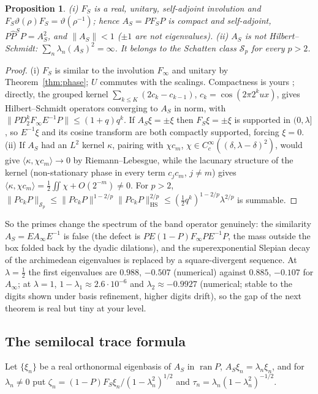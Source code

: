 \documentclass[11pt]{amsart}
\newtheorem{proposition}[theorem]{Proposition}
\theoremstyle{definition}
\theoremstyle{remark}
\newcommand{\ran}{\operatorname{ran}}
\newcommand{\Pih}{\widehat P}
\begin{document}
\begin{proposition}\label{prop:AS}
\emph{(i)} $F_S$ is a real, unitary, self-adjoint involution and $F_S\vartheta(\rho)F_S=\vartheta(\rho^{-1})$; hence
$A_S=PF_SP$ is compact and self-adjoint, $P\Pih^SP=A_S^2$, and $\|A_S\|<1$ ($\pm1$ are not eigenvalues).
\emph{(ii)} $A_S$ is not Hilbert--Schmidt: $\sum_n\lambda_n(A_S)^2=\infty$. It belongs to the Schatten class
$\mathcal S_p$ for every $p>2$.
\end{proposition}
\begin{proof}
(i) $F_S$ is similar to the involution $F_\infty$ and unitary by Theorem~\ref{thm:phase}; $U$ commutes with the scalings.
Compactness is yours \cite[Thms.~2.1, 4.4]{CCquasi}; directly, the grouped kernel $\sum_{k\le K}(2c_k-c_{k-1})$,
$c_k=\cos(2\pi2^kux)$, gives Hilbert--Schmidt operators converging to $A_S$ in norm, with
$\|PD_2^kF_\infty E^{-1}P\|\le(1+q)q^k$. If $A_S\xi=\pm\xi$ then $F_S\xi=\pm\xi$ is supported in $(0,\lambda]$, so
$E^{-1}\xi$ and its cosine transform are both compactly supported, forcing $\xi=0$.
(ii) If $A_S$ had an $L^2$ kernel $\kappa$, pairing with $\chi c_m$, $\chi\in C_c^\infty((\delta,\lambda-\delta)^2)$, would
give $\langle\kappa,\chi c_m\rangle\to0$ by Riemann--Lebesgue, while the lacunary structure of the kernel (non-stationary phase
in every term $c_jc_m$, $j\ne m$) gives $\langle\kappa,\chi c_m\rangle=\frac12\iint\chi+O(2^{-m})\ne0$. For $p>2$,
$\|Pc_kP\|_{\mathcal S_p}\le\|Pc_kP\|^{1-2/p}\|Pc_kP\|_{\mathrm{HS}}^{2/p}\le(\tfrac12q^k)^{1-2/p}\lambda^{2/p}$ is summable.
\end{proof}

So the primes change the spectrum of the band operator genuinely: the similarity $A_S=EA_\infty E^{-1}$ is false
(the defect is $PE(1-P)F_\infty PE^{-1}P$, the mass outside the box folded back by the dyadic dilations), and the
superexponential Slepian decay of the archimedean eigenvalues is replaced by a square-divergent sequence. At
$\lambda=\frac12$ the first eigenvalues are $0.988$, $-0.507$ (numerical) against $0.885$, $-0.107$ for $A_\infty$;
at $\lambda=1$, $1-\lambda_1\approx2.6\cdot10^{-6}$ and $\lambda_2\approx-0.9927$ (numerical; stable to the digits shown under basis refinement, higher digits drift),
so the gap of the next theorem is real but tiny at your level.

\subsection{The semilocal trace formula}
Let $\{\xi_n\}$ be a real orthonormal eigenbasis of $A_S$ in $\ran P$, $A_S\xi_n=\lambda_n\xi_n$, and for $\lambda_n\ne0$
put $\zeta_n=(1-P)F_S\xi_n/(1-\lambda_n^2)^{1/2}$ and $\tau_n=\lambda_n(1-\lambda_n^2)^{-1/2}$.
\end{document}
